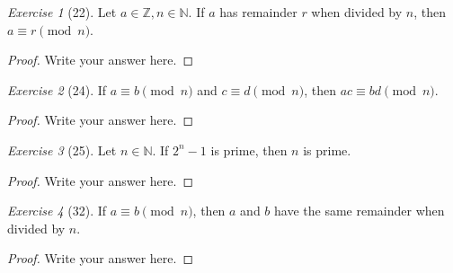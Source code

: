 \documentclass[12pt]{amsart}
\theoremstyle{remark}
\newtheorem*{exercise}{Exercise}%
\def\NN{\ensuremath{\mathbb N}}
\def\ZZ{\ensuremath{\mathbb Z}}
\theoremstyle{mycomment}
\begin{document}
\begin{exercise}[22] Let $a\in\ZZ, n\in\NN$. If $a$ has remainder $r$ when divided by $n$, then $a\equiv r\pmod n$.
\begin{proof}
Write your answer here.
\end{proof}
\end{exercise}

\begin{exercise}[24] If $a\equiv b\pmod n$ and $c\equiv d\pmod n$, then $ac\equiv bd\pmod n$. 
\begin{proof}
Write your answer here.
\end{proof}
\end{exercise}


\begin{exercise}[25] Let $n\in\NN$. If $2^{n}-1$ is prime, then $n$ is prime.
\begin{proof}
Write your answer here.
\end{proof}
\end{exercise}

\begin{exercise}[32] If $a\equiv b\pmod n$, then $a$ and $b$ have the same remainder when divided by $n$.
\begin{proof}
Write your answer here.
\end{proof}
\end{exercise}





 
\end{document}

